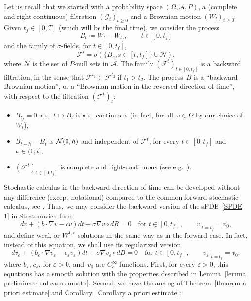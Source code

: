 \documentclass[a4paper,10pt]{article}
\newcommand\1{\mathbbm{1}}
\newcommand{\eps}{\varepsilon}
\numberwithin{equation}{section}
\begin{document}
Let us recall that we started with a probability space $(\Omega,\mathcal{A},P)$, a (complete and right-continuous) filtration $(\mathcal{G}_{t})_{t\geq0}$ and a Brownian motion $(W_{t})_{t\geq0}$. Given $t_{f}\in [0,T]$ (which will be the final time), we consider the process
\begin{equation}
B_{t}\coloneqq W_{t}-W_{t_{f}},\qquad t\in [0,t_{f}]
\end{equation}
and the family of $\sigma$-fields, for $t \in [0,t_{f}]$,
\begin{equation}
\mathcal{F}^{t}=\sigma (\{  B_{s},s\in [t,t_{f}] \} \cup \mathcal{N} ),
\end{equation}
where $\mathcal{N}$ is the set of $P$-null sets in $\mathcal{A}$. The family $(\mathcal{F}^{t})_{t\in [0,t_{f}]}$ is a backward filtration, in the sense that $\mathcal{F}^{t_{1}} \subset\mathcal{F}^{t_{2}}$ if $t_{1}>t_{2}$. The process~$B$ is a ``backward Brownian motion'', or a ``Brownian motion in the reversed direction of time'', with respect to the filtration $(\mathcal{F}^{t})_t$:

\begin{itemize}
  \item $B_{t_{f}}=0$ a.s., $t\mapsto B_{t}$ is a.s.~continuous (in fact, for all $\omega \in \Omega$ by our choice of $W_t$), 
  \item $B_{t-h}-B_{t}$ is ${\cal N}(0,h)$ and independent of $\mathcal{F}^{t}$, for every $t\in [0,t_{f}]$ and $h \in (0,t]$,
  \item $(\mathcal{F}^{t})_{t\in [0,t_{f}]}$ is complete and right-continuous (see e.g.~\cite[Proposition 2.5]{BASS11}).
\end{itemize}

Stochastic calculus in the backward direction of time can be developed without any difference (except notational) compared to the common forward stochastic calculus, see \cite[Chapter~3]{KUNITA84}. Thus, we may consider the backward version of the sPDE~\eqref{SPDE 1} in Stratonovich form
\begin{equation*}
dv+ ( b\cdot\nabla v  -cv)  dt+\sigma\nabla v\circ
dB  =0 \quad \text{for } t\in [0,t_{f}], \qquad
v|_{t=t_{f}}  =v_{0} ,
\end{equation*}
and define weak or $W^{1,r}$ solutions in the same way as in the forward case. In fact, instead of this equation, we shall use its regularized version
\begin{equation}
\label{backward SPDE 1}
dv_{\eps} + ( b_{\eps}\cdot\nabla v_{\eps} -c_{\eps}v_{\eps})  dt+\sigma\nabla v_{\eps}\circ dB 
=0 \quad \text{for } t\in [0,t_{f}], \qquad v_{\eps}|_{t=t_{f}}  =v_{0} ,
\end{equation}
where $b_{\eps}$, $c_{\eps}$, for $\eps>0$, and~$v_{0}$ are $C_{c}^{\infty}$ functions. First, for every $\eps>0$, this equations has a smooth solution with the properties described in Lemma~\ref{lemma preliminare sul caso smooth}. Second, we have the analog of Theorem~\ref{theorem a priori estimate} and Corollary~\ref{Corollary a priori estimate}:
\end{document}

